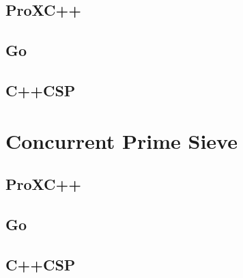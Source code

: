 \subsection*{ProXC++}

\subsection*{Go}

\subsection*{C++CSP}


\section*{Concurrent Prime Sieve}

\subsection*{ProXC++}
%

\subsection*{Go}

\subsection*{C++CSP}
